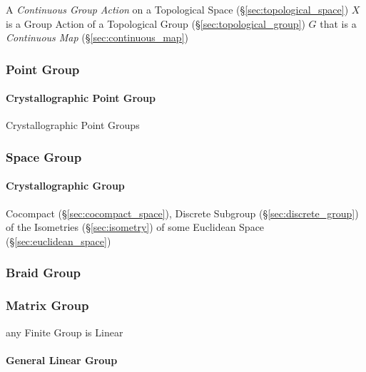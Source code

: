 A \emph{Continuous Group Action} on a Topological Space
(\S\ref{sec:topological_space}) $X$ is a Group Action of a Topological Group
(\S\ref{sec:topological_group}) $G$ that is a \emph{Continuous Map}
(\S\ref{sec:continuous_map})



\subsubsection{Point Group}\label{sec:point_group}

\paragraph{Crystallographic Point Group}\label{sec:crystallographic_point_group}
\hfill

Crystallographic Point Groups



\subsubsection{Space Group}\label{sec:space_group}

\paragraph{Crystallographic Group}\label{sec:crystallographic_group}\hfill

Cocompact (\S\ref{sec:cocompact_space}), Discrete Subgroup
(\S\ref{sec:discrete_group}) of the Isometries (\S\ref{sec:isometry}) of some
Euclidean Space (\S\ref{sec:euclidean_space})



\subsubsection{Braid Group}\label{sec:braid_group}

\subsubsection{Matrix Group}\label{sec:matrix_group}

any Finite Group is Linear



\paragraph{General Linear Group}\label{sec:general_linear_group}\hfill

